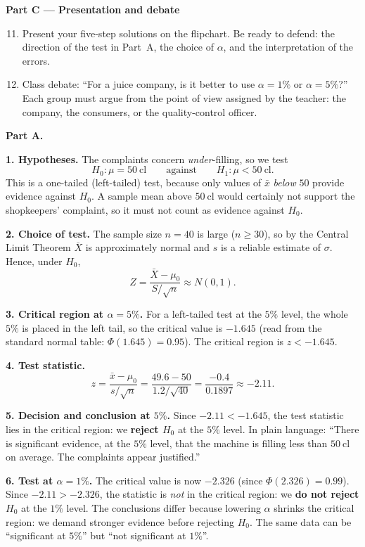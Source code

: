 \documentclass[11pt]{article}
\newcommand{\cle}[1]{{\popxbold\color{popdark}#1}}
\newcounter{popsec}
\newcounter{popsub}
\newcommand{\courssub}[1]{%
  \stepcounter{popsub}%
  \par\vspace{9pt}\noindent{\popxbold\fontsize{11.5}{13}\selectfont\color{popink}{\color{poporange}\thepopsec.\thepopsub}\hspace{6pt}#1}\par\nopagebreak\vspace{4pt}
}
\begin{document}
\textbf{Part C — Presentation and debate}

\begin{enumerate}
\setcounter{enumi}{10}
\item Present your five-step solutions on the flipchart. Be ready to defend: the direction of the test in Part~A, the choice of $\alpha$, and the interpretation of the errors.
\item Class debate: ``For a juice company, is it better to use $\alpha = 1\%$ or $\alpha = 5\%$?'' Each group must argue from the point of view assigned by the teacher: the company, the consumers, or the quality-control officer.
\end{enumerate}

\courssub{Model answer}

\textbf{Part A.}

\textbf{1. Hypotheses.} The complaints concern \emph{under}-filling, so we test
\[
H_0 : \mu = 50\ \mathrm{cl} \qquad \text{against} \qquad H_1 : \mu < 50\ \mathrm{cl}.
\]
This is a \cle{one-tailed} (left-tailed) test, because only values of $\bar{x}$ \emph{below} $50$ provide evidence against $H_0$. A sample mean above $50\ \mathrm{cl}$ would certainly not support the shopkeepers' complaint, so it must not count as evidence against $H_0$.

\textbf{2. Choice of test.} The sample size $n = 40$ is large ($n \geq 30$), so by the Central Limit Theorem $\bar{X}$ is approximately normal and $s$ is a reliable estimate of $\sigma$. Hence, under $H_0$,
\[
Z = \frac{\bar{X}-\mu_0}{S/\sqrt{n}} \approx N(0,1).
\]

\textbf{3. Critical region at $\alpha = 5\%$.} For a left-tailed test at the $5\%$ level, the whole $5\%$ is placed in the left tail, so the critical value is $-1.645$ (read from the standard normal table: $\Phi(1.645) = 0.95$). The critical region is $z < -1.645$.

\textbf{4. Test statistic.}
\[
z = \frac{\bar{x}-\mu_0}{s/\sqrt{n}} = \frac{49.6 - 50}{1.2/\sqrt{40}} = \frac{-0.4}{0.1897} \approx -2.11.
\]

\textbf{5. Decision and conclusion at $5\%$.} Since $-2.11 < -1.645$, the test statistic lies in the critical region: we \textbf{reject $H_0$} at the $5\%$ level. In plain language: ``There is significant evidence, at the $5\%$ level, that the machine is filling less than $50\ \mathrm{cl}$ on average. The complaints appear justified.''

\textbf{6. Test at $\alpha = 1\%$.} The critical value is now $-2.326$ (since $\Phi(2.326) = 0.99$). Since $-2.11 > -2.326$, the statistic is \emph{not} in the critical region: we \textbf{do not reject $H_0$} at the $1\%$ level. The conclusions differ because lowering $\alpha$ shrinks the critical region: we demand stronger evidence before rejecting $H_0$. The same data can be ``significant at $5\%$'' but ``not significant at $1\%$''.
\end{document}
